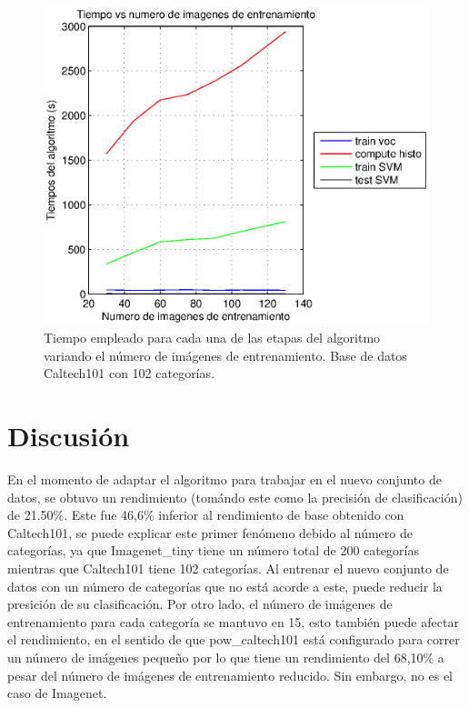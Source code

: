 \documentclass[10pt,twocolumn,letterpaper]{article}
\begin{document}
\begin{figure}[t]
\begin{center}
   \includegraphics[width=1\linewidth]{time.eps}
\end{center}
   \caption{Tiempo empleado para cada una de las etapas del algoritmo variando el número de imágenes de entrenamiento. Base de datos Caltech101 con 102 categorías.}
\label{fig:seg}
\end{figure}

\section{Discusión}

En el momento de adaptar el algoritmo para trabajar en el nuevo conjunto de datos, se obtuvo un rendimiento (tomándo este como la precisión de clasificación) de 21.50\%. Este fue 46,6\% inferior al rendimiento de base obtenido con Caltech101, se puede explicar este primer fenómeno debido al número de categorías, ya que Imagenet\_tiny tiene un número total de 200 categorías mientras que Caltech101 tiene 102 categorías. Al entrenar el nuevo conjunto de datos con un número de categorías que no está acorde a este, puede reducir la presición de su clasificación. Por otro lado, el número de imágenes de entrenamiento para cada categoría se mantuvo en 15, esto también puede afectar el rendimiento, en el sentido de que pow\_caltech101 está configurado para correr un número de imágenes pequeño por lo que tiene un rendimiento del 68,10\% a pesar del número de imágenes de entrenamiento reducido. Sin embargo, no es el caso de Imagenet.
\end{document}
